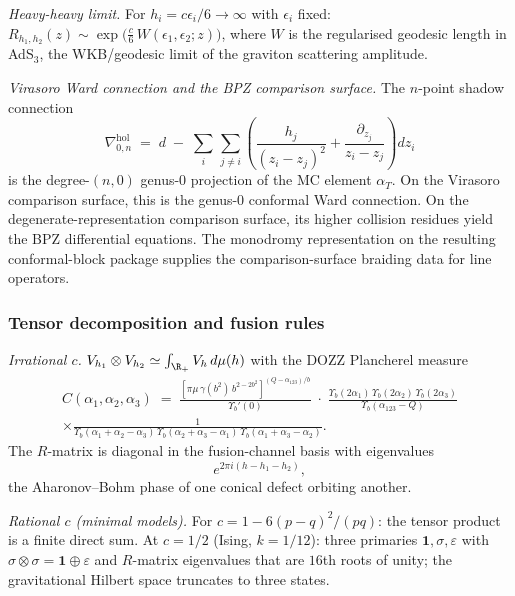 \emph{Heavy-heavy limit.}\enspace
For $h_i = c\epsilon_i/6 \to \infty$ with $\epsilon_i$ fixed:
$R_{h_1,h_2}(z) \sim
\exp\!\bigl(\frac{c}{6}\,W(\epsilon_1, \epsilon_2; z)\bigr)$,
where $W$ is the regularised geodesic length in AdS$_3$, the
WKB/geodesic limit of the graviton scattering amplitude.

\emph{Virasoro Ward connection and the BPZ comparison surface.}\enspace
The $n$-point shadow connection
\begin{equation}\label{eq:bpz-shadow-connection}
\nabla^{\mathrm{hol}}_{0,n}
\;=\;
d
\;-\;
\sum_{i}\,\sum_{j \neq i}
\left(
\frac{h_j}{(z_i - z_j)^2}
+ \frac{\partial_{z_j}}{z_i - z_j}
\right) dz_i
\end{equation}
is the degree-$(n,0)$ genus-$0$ projection of the MC element
$\alpha_T$. On the Virasoro comparison surface, this is the
genus-$0$ conformal Ward connection. On the degenerate-representation
comparison surface, its higher collision residues yield the BPZ
differential equations. The monodromy representation on
the resulting conformal-block package supplies the comparison-surface
braiding data for line operators.

\subsubsection*{Tensor decomposition and fusion rules}

\emph{Irrational $c$.}\enspace
$V_{h_1} \otimes V_{h_2} \simeq \int_{\R_+} V_h\,d\mu(h)$
with the DOZZ Plancherel measure
\begin{multline}\label{eq:dozz}
C(\alpha_1, \alpha_2, \alpha_3)
\;=\;
\frac{[\pi\mu\,\gamma(b^2)\,b^{2-2b^2}]^{(Q-\alpha_{123})/b}}
 {\Upsilon_b'(0)}
\;\cdot\;
\frac{\Upsilon_b(2\alpha_1)\,\Upsilon_b(2\alpha_2)\,
 \Upsilon_b(2\alpha_3)}
 {\Upsilon_b(\alpha_{123} - Q)}\\
\times
\frac{1}{\Upsilon_b(\alpha_1{+}\alpha_2{-}\alpha_3)\,
 \Upsilon_b(\alpha_2{+}\alpha_3{-}\alpha_1)\,
 \Upsilon_b(\alpha_1{+}\alpha_3{-}\alpha_2)}.
\end{multline}
The $R$-matrix is diagonal in the fusion-channel basis with
eigenvalues
\begin{equation}\label{eq:r-matrix-diagonal}
e^{2\pi i(h - h_1 - h_2)},
\end{equation}
the Aharonov--Bohm phase of one conical defect orbiting another.

\emph{Rational $c$ (minimal models).}\enspace
For $c = 1 - 6(p-q)^2/(pq)$: the tensor product is a finite direct
sum. At $c = 1/2$ (Ising, $k = 1/12$): three primaries
$\mathbf{1}, \sigma, \varepsilon$ with $\sigma \otimes \sigma
= \mathbf{1} \oplus \varepsilon$ and $R$-matrix eigenvalues that
are $16$th roots of unity; the gravitational Hilbert space truncates
to three states.

